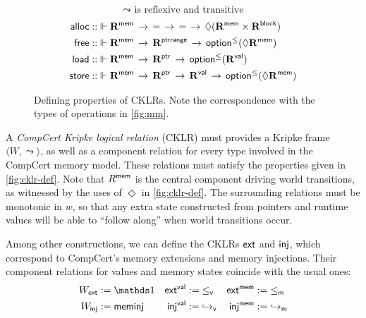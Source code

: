 \documentclass[sigplan,screen]{acmart}
\newcommand{\figsize}{\small}
\begin{document}
\begin{figure} %
  \figsize
  \begin{gather*}
    {\leadsto} \mbox{ is reflexive and transitive}
  \end{gather*}
  \begin{align*}
       \mathsf{alloc}  ::
        &\Vdash \mathbf{R}^{ \mathsf{mem} } \,\rightarrow\, {=} \,\rightarrow\, {=} \,\rightarrow\,
        \Diamond (\mathbf{R}^{ \mathsf{mem} } \times \mathbf{R}^{ \mathsf{block} })
      \\
       \mathsf{free}  ::
        &\Vdash \mathbf{R}^{ \mathsf{mem} } \,\rightarrow\, \mathbf{R}^{ \mathsf{ptrrange} } \,\rightarrow\,
         \mathsf{option} ^\le(\Diamond \mathbf{R}^{ \mathsf{mem} })
      \\
       \mathsf{load}  ::
        &\Vdash \mathbf{R}^{ \mathsf{mem} } \,\rightarrow\, \mathbf{R}^{ \mathsf{ptr} } \,\rightarrow\,
         \mathsf{option} ^\le(\mathbf{R}^{ \mathsf{val} })
      \\
       \mathsf{store}  ::
        &\Vdash \mathbf{R}^{ \mathsf{mem} } \,\rightarrow\, \mathbf{R}^{ \mathsf{ptr} } \,\rightarrow\,
	\mathbf{R}^{ \mathsf{val} } \,\rightarrow\,
         \mathsf{option} ^\le(\Diamond \mathbf{R}^{ \mathsf{mem} })
  \end{align*}
  \caption{Defining properties of CKLRs.
    Note the correspondence with
    the types of operations in \autoref{fig:mm}.}
  \label{fig:cklr-def}
\end{figure}

A \emph{CompCert Kripke logical relation} (CKLR)
must provides a Kripke frame $\langle W, {\leadsto} \rangle$,
as well as a component relation for every type involved
in the CompCert memory model.
These relations must satisfy
the properties given in \autoref{fig:cklr-def}.
Note that $R^{ \mathsf{mem} }$
is the central component driving world transitions,
as witnessed by the uses of $\Diamond$ in \autoref{fig:cklr-def}.
The surrounding relations must be monotonic in $w$,
so that any extra state
constructed from pointers and runtime values
will be able to ``follow along'' when
world transitions occur.

Among other constructions,
we can define
the CKLRs $ \mathsf{ext} $ and $ \mathsf{inj} $,
which correspond to
CompCert's memory extensions and memory injections.
Their component relations for values and memory states
coincide with the usual ones:
\begin{align*}
  W_\kw{ext} &:= \unitset &
  \kw{ext}^\kw{val} &:= {\vref} &
  \kw{ext}^\kw{mem} &:= {\mext} \\
  W_\kw{inj} &:= \kw{meminj} &
  \kw{inj}^\kw{val} &:= {\hookrightarrow_\kw{v}} &
  \kw{inj}^\kw{mem} &:= {\hookrightarrow_\kw{m}}
\end{align*}
\end{document}
